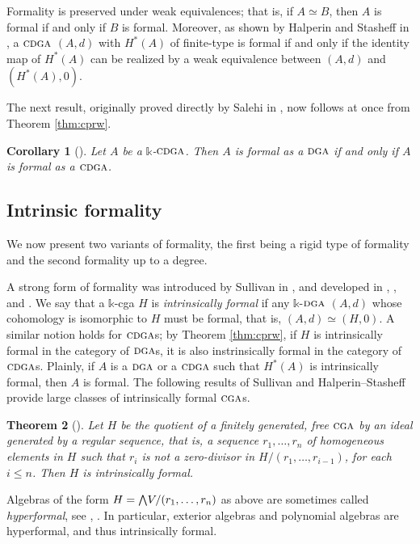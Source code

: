 \documentclass{article}
\numberwithin{equation}{section}
\newtheorem{theorem}{Theorem}[section]
\newtheorem{corollary}[theorem]{Corollary}
\theoremstyle{definition}
\renewcommand{\k}{\mathbb{k}}
\newcommand{\dga}{\ensuremath{\textsc{dga}}}
\newcommand{\cga}{\ensuremath{\textsc{cga}}}
\newcommand{\cdga}{\ensuremath{\textsc{cdga}}}
\newcommand{\bwedge}{\mbox{\normalsize $\bigwedge$}}
\begin{document}
Formality is preserved under weak equivalences; that is, if $A\simeq B$, 
then $A$ is formal if and only if $B$ is formal. Moreover, as shown by 
Halperin and Stasheff in \cite{HS79}, a $\cdga$ $(A,d)$ with $H^{*}(A)$ 
of finite-type is formal if and only if the identity map of $H^{*}(A)$ 
can be realized by a weak equivalence between $(A,d)$ and $(H^{*}(A),0)$.

The next result, originally proved directly by Salehi in \cite{Sa17}, now 
follows at once from Theorem \ref{thm:cprw}.

\begin{corollary}[\cite{Sa17}]
\label{cor:salehi}
Let $A$ be a $\k$-$\cdga$. Then $A$ is formal as a $\dga$ if 
and only if $A$ is formal as a $\cdga$.
\end{corollary}

\subsection{Intrinsic formality}
\label{subsec:intrinsic-formal}
We now present two variants of formality, the first being a rigid type  
of formality and the second formality up to a degree. 

A strong form of formality was introduced by Sullivan 
in \cite{Sullivan77}, and developed in \cite{HS79}, \cite{FH82}, and 
\cite{Lupton}.  We say that a $\k$-cga $H$ is {\em intrinsically formal}\/ 
if any $\k$-$\dga$ $(A,d)$ whose cohomology is isomorphic to 
$H$ must be formal, that is, $(A,d)\simeq (H, 0)$. 
A similar notion holds for $\cdga$s; by Theorem \ref{thm:cprw}, 
if $H$ is intrinsically formal in the category of $\dga$s,  
it is also instrinsically formal in the category of  $\cdga$s.
Plainly, if $A$ is a $\dga$ or a $\cdga$ such that $H^*(A)$ 
is intrinsically formal, then $A$ is formal. 
The following results of Sullivan and Halperin--Stasheff provide 
large classes of intrinsically formal $\cga$s.  

\begin{theorem}[\cite{Sullivan77}]
\label{thm:regular-intrinsic}
Let $H$ be the quotient of a finitely generated, free $\cga$ 
by an ideal generated by a regular sequence, that is, a sequence 
$r_1,\dots, r_n$ of homogeneous elements in $H$ such that $r_i$ 
is not a zero-divisor in $H/(r_1,\dots, r_{i-1})$, for each $i\le n$. 
Then $H$ is intrinsically formal.
\end{theorem}

Algebras of the form $H=\bwedge V/(r_1,\dots, r_{n})$ as above 
are sometimes called {\em hyperformal}, see \cite{FH82}, \cite{Lupton}. 
In particular, exterior algebras and polynomial algebras are 
hyperformal, and thus intrinsically formal.
\end{document}
